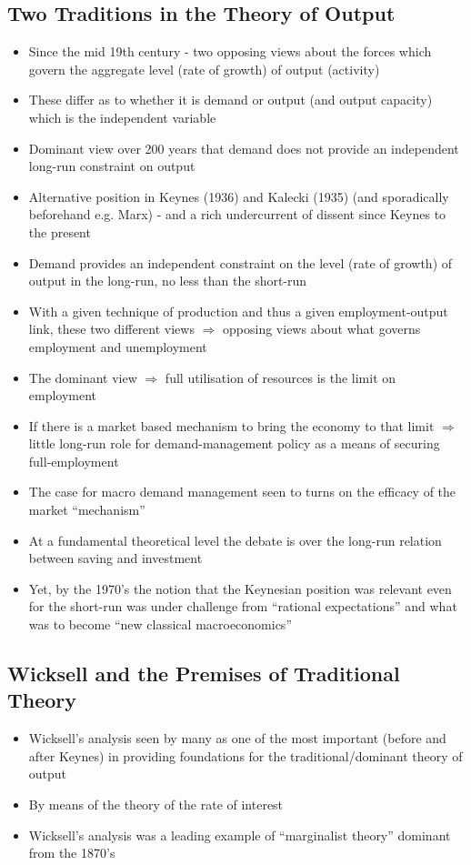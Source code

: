 \documentclass[a4paper,twoside]{article}
\numberwithin{equation}{section}
\numberwithin{figure}{section}
\begin{document}
\subsection{Two Traditions in the Theory of Output}
	\begin{itemize}
		\item Since the mid 19th century - two opposing views about the forces which govern the aggregate level (rate of growth) of output (activity)
		\item These differ as to whether it is demand or output (and output capacity) which is the independent variable
		\item Dominant view over 200 years that demand does not provide an independent long-run constraint on output
		\item Alternative position in Keynes (1936) and Kalecki (1935) (and sporadically beforehand e.g. Marx) - and a rich undercurrent of dissent since Keynes to the present
		\item Demand provides an independent constraint on the level (rate of growth) of output in the long-run, no less than the short-run
		\item With a given technique of production and thus a given employment-output link, these two different views \( \Rightarrow \) opposing views about what governs employment and unemployment
		\item The dominant view \( \Rightarrow \) full utilisation of resources is the limit on employment
		\item If there is a market based mechanism to bring the economy to that limit \( \Rightarrow \) little long-run role for demand-management policy as a means of securing full-employment
		\item The case for macro demand management seen to turns on the efficacy of the market ``mechanism''
		\item At a fundamental theoretical level the debate is over the long-run relation between saving and investment
		\item Yet, by the 1970's the notion that the Keynesian position was relevant even for the short-run was under challenge from ``rational expectations'' and what was to become ``new classical macroeconomics''
	\end{itemize}
\subsection{Wicksell and the Premises of Traditional Theory}
	\begin{itemize}
		\item Wicksell's analysis seen by many as one of the most important (before and after Keynes) in providing foundations for the traditional/dominant theory of output
		\item By means of the theory of the rate of interest
		\item Wicksell's analysis was a leading example of ``marginalist theory'' dominant from the 1870's
	\end{itemize}
\end{document}
